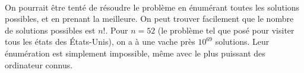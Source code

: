 \documentclass[a4paper]{report}
\theoremstyle{definition}
\theoremstyle{remark}
\theoremstyle{plain}
\begin{document}
\paragraph{}On pourrait être tenté de résoudre le problème en énumérant toutes
les solutions possibles, et en prenant la meilleure. On peut trouver facilement
que le nombre de solutions possibles est \(n!\). Pour \(n=52\) (le problème
tel que posé pour visiter tous les états des États-Unis), on a à une vache près
\(10^{69}\) solutions. Leur énumération est simplement impossible, même avec le
plus puissant des ordinateur connus.
\end{document}
